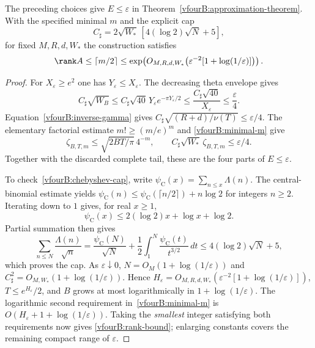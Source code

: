 \begin{proposition}
\label{vfourB:rank-schedule}
The preceding choices give $E\le\varepsilon$ in
Theorem~\ref{vfourB:approximation-theorem}. With the specified minimal $m$
and the explicit cap
\begin{equation}\label{vfourB:chebyshev-cap}
 C_\sharp=2\sqrt{W_*}\,[4(\log2)\sqrt N+5],
\end{equation}
for fixed $M,R,d,W_*$ the construction satisfies
\begin{equation}\label{vfourB:rank-bound}
 \rank A\le\lceil m/2\rceil
 \le\exp\!\left(O_{M,R,d,W_*}
       \bigl(\varepsilon^{-2}[1+\log(1/\varepsilon)]\bigr)\right).
\end{equation}
\end{proposition}
\begin{proof}
For $X_\varepsilon\ge e^2$ one has
$Y_\varepsilon\le X_\varepsilon$. The decreasing theta envelope gives
\[
 C_\sharp\sqrt{W_B}
 \le C_\sharp\sqrt{40}\,Y_\varepsilon
                  e^{-\pi Y_\varepsilon/2}
 \le\frac{C_\sharp\sqrt{40}}{X_\varepsilon}
 \le\frac{\varepsilon}{4}.
\]
Equation~\eqref{vfourB:inverse-gamma} gives
$C_\sharp\sqrt{(R+d)/\nu(T)}\le\varepsilon/4$.
The elementary factorial estimate $m!\ge(m/e)^m$ and
\eqref{vfourB:minimal-m} give
\[
 \zeta_{B,T,m}\le\sqrt{2BT/\pi}\,4^{-m},\qquad
 C_\sharp\sqrt{W_*}\,\zeta_{B,T,m}\le\varepsilon/4.
\]
Together with the discarded complete tail, these are the four parts of
$E\le\varepsilon$.

To check~\eqref{vfourB:chebyshev-cap}, write
$\psi_{\mathrm C}(x)=\sum_{n\le x}\Lambda(n)$.
The central-binomial estimate yields
$\psi_{\mathrm C}(n)\le\psi_{\mathrm C}(\lceil n/2\rceil)+n\log2$
for integers $n\ge2$. Iterating down to $1$ gives, for real $x\ge1$,
\[
 \psi_{\mathrm C}(x)\le2(\log2)x+\log x+\log2.
\]
Partial summation then gives
\[
 \sum_{n\le N}\frac{\Lambda(n)}{\sqrt n}
 =\frac{\psi_{\mathrm C}(N)}{\sqrt N}
   +\frac12\int_1^N\frac{\psi_{\mathrm C}(t)}{t^{3/2}}\,dt
 \le4(\log2)\sqrt N+5,
\]
which proves the cap. As $\varepsilon\downarrow0$,
$N=O_M(1+\log(1/\varepsilon))$ and
$C_\sharp^2=O_{M,W_*}(1+\log(1/\varepsilon))$.
Hence
$H_\varepsilon=O_{M,R,d,W_*}
(\varepsilon^{-2}[1+\log(1/\varepsilon)])$,
$T\le e^{H_\varepsilon}/2$, and $B$ grows at most logarithmically in
$1+\log(1/\varepsilon)$. The logarithmic second requirement
in~\eqref{vfourB:minimal-m} is $O(H_\varepsilon+1+\log(1/\varepsilon))$.
Taking the \emph{smallest} integer satisfying both requirements now gives
\eqref{vfourB:rank-bound}; enlarging constants covers the remaining compact
range of $\varepsilon$.
\end{proof}

